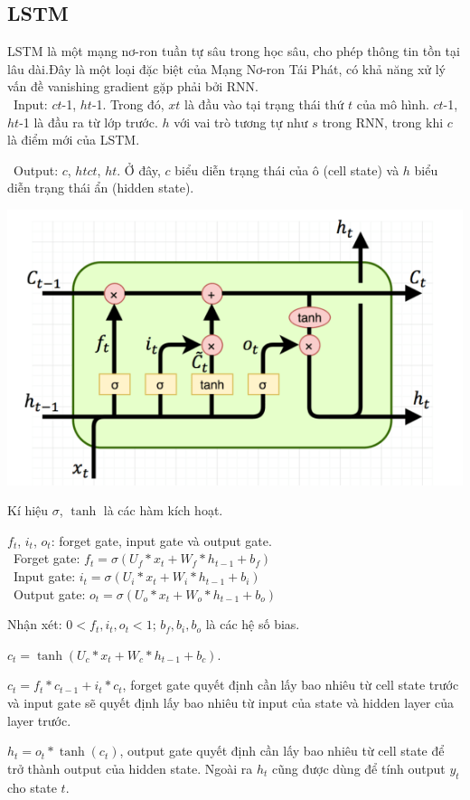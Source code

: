 \subsection{LSTM}
LSTM là một mạng nơ-ron tuần tự sâu trong học sâu, cho phép thông tin tồn tại lâu dài.Đây là một loại đặc biệt của Mạng Nơ-ron Tái Phát, có khả năng xử lý vấn đề vanishing gradient gặp phải bởi RNN.\\
\indent\textbullet\ Input: \(ct\)-1, \(ht\)-1. Trong đó, \(xt\) là đầu vào tại trạng thái thứ \(t\) của mô hình. \(ct\)-1, \(ht\)-1 là đầu ra từ lớp trước. \(h\) với vai trò tương tự như \(s\) trong RNN, trong khi \(c\) là điểm mới của LSTM.

\indent\textbullet\ Output: \(c\), \(htct\), \(ht\). Ở đây, \(c\) biểu diễn trạng thái của ô (cell state) và \(h\) biểu diễn trạng thái ẩn (hidden state).

\begin{minipage}{0.5\textwidth}
\centering
\includegraphics[width=1\textwidth]{resources/chapter-4/lstm-1.png}
\end{minipage}

Kí hiệu \(\sigma\), \(\tanh\) là các hàm kích hoạt.
\par
\( f_t \), \( i_t \), \( o_t \): forget gate, input gate và output gate.\\
    \indent\textbullet\ Forget gate: \( f_t = \sigma\left(U_f \ast x_t + W_f \ast h_{t-1} + b_f\right) \)\\
    \indent\textbullet\ Input gate: \( i_t = \sigma\left(U_i \ast x_t + W_i \ast h_{t-1} + b_i\right) \)\\
    \indent\textbullet\ Output gate: \( o_t = \sigma\left(U_o \ast x_t + W_o \ast h_{t-1} + b_o\right) \)
\par
Nhận xét: \( 0 < f_t, i_t, o_t < 1 \); \( b_f, b_i, b_o \) là các hệ số bias.
\par
\( c_t = \tanh\left(U_c \ast x_t + W_c \ast h_{t-1} + b_c\right) \).
\par
\( c_t = f_t \ast c_{t-1} + i_t \ast c_t \), forget gate quyết định cần lấy bao nhiêu từ cell state trước và input gate sẽ quyết định lấy bao nhiêu từ input của state và hidden layer của layer trước.
\par
\( h_t = o_t \ast \tanh\left(c_t\right) \), output gate quyết định cần lấy bao nhiêu từ cell state để trở thành output của hidden state. Ngoài ra \( h_t \) cũng được dùng để tính output \( y_t \) cho state \( t \).

